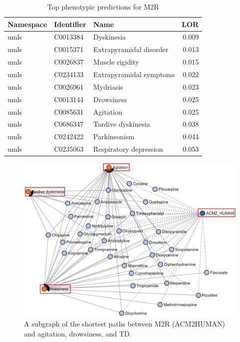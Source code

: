 \begin{table}[!ht]
    \centering
    \begin{tabular}{ |l|l|l|r| }
        \hline
        \textbf{Namespace} & \textbf{Identifier} & \textbf{Name} & \textbf{LOR}  \\
        \hline
        umls & C0013384 & Dyskinesia & 0.009  \\
        \hline
        umls & C0015371 & Extrapyramidal disorder & 0.013  \\
        \hline
        umls & C0026837 & Muscle rigidity & 0.015  \\
        \hline
        umls & C0234133 & Extrapyramidal symptoms & 0.022  \\
        \hline
        umls & C0026961 & Mydriasis & 0.023  \\
        \hline
        umls & C0013144 & Drowsiness & 0.025  \\
        \hline
        umls & C0085631 & Agitation & 0.025  \\
        \hline
        umls & C0686347 & Tardive dyskinesia & 0.038  \\
        \hline
        umls & C0242422 & Parkinsonism & 0.044  \\
        \hline
        umls & C0235063 & Respiratory depression & 0.053 \\
        \hline
    \end{tabular}
    \captionsetup{justification=centering}
    \caption{Top phenotypic predictions for M2R}
    \label{tab:target_phenotype}
\end{table}

\begin{figure}[!ht]
    \centering
    \includegraphics[scale=0.6]
    {figures/chrm2_phenotypes.jpg}
    \caption[The shortest paths between M2R, agitation, drowsiness, and tardive dyskinesia]{\label{fig:chrm2_phenotypes} A subgraph of the shortest paths between M2R (ACM2\textunderscore HUMAN) and agitation, drowsiness, and \ac{TD}.}
\end{figure}



